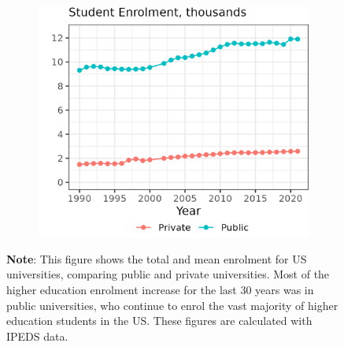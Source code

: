 \begin{figure}[H]
\begin{subfigure}[b]{0.495\textwidth}
        \includegraphics[width=\textwidth]{figures/enrollment-mean.png}
        \label{fig:enrollment-mean}
    \end{subfigure}
    \label{fig:enrolment}
    \justify
    \footnotesize
    \textbf{Note}:
    This figure shows the total and mean enrolment for US universities, comparing public and private universities.
    Most of the higher education enrolment increase for the last 30 years was in public universities, who continue to enrol the vast majority of higher education students in the US.
    These figures are calculated with IPEDS data.
\end{figure}

